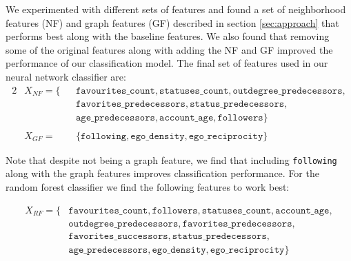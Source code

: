 We experimented with different sets of features and found a set of neighborhood features (NF) and graph features (GF) described in section \ref{sec:approach} that performs best along with the baseline features. We also found that removing some of the original features along with adding the  NF and GF improved the performance of our classification model. The final set of features used in our neural network classifier are:
\begin{alignat*}{2}
    & X_{NF} = \{ && \texttt{favourites\_count}, \texttt{statuses\_count}, \texttt{outdegree\_predecessors}, \\
    & && \texttt{favorites\_predecessors}, \texttt{status\_predecessors}, \\
    & && \texttt{age\_predecessors}, \texttt{account\_age}, \texttt{followers} \} \\
    \\
    & X_{GF} = && \{ \texttt{following}, \texttt{ego\_density}, \texttt{ego\_reciprocity} \}
\end{alignat*}

\noindent Note that despite not being a graph feature, we find that including \texttt{following} along with the graph features improves classification performance. For the random forest classifier we find the following features to work best:

\begin{align*}
    X_{RF} = \{ & \texttt{favourites\_count}, \texttt{followers}, \texttt{statuses\_count}, \texttt{account\_age}, \\
    & \texttt{outdegree\_predecessors}, \texttt{favorites\_predecessors}, \\
    & \texttt{favorites\_successors}, \texttt{status\_predecessors}, \\
    & \texttt{age\_predecessors}, \texttt{ego\_density}, \texttt{ego\_reciprocity} \}
\end{align*}

